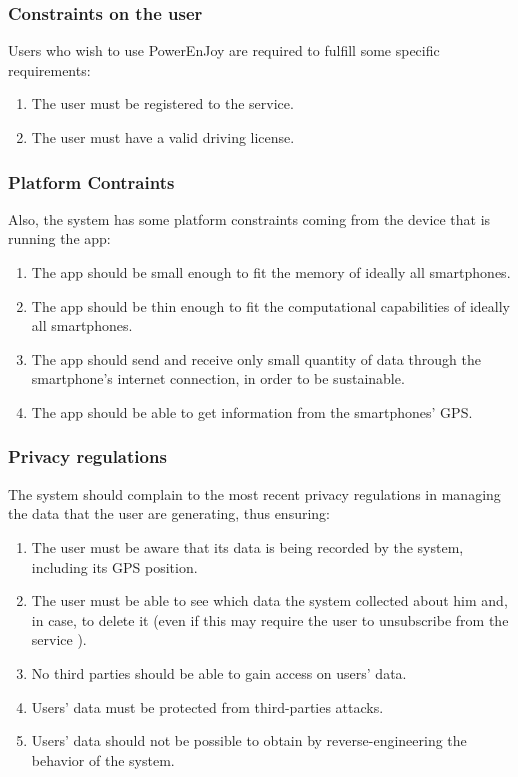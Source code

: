 \documentclass[11pt]{article} %
\newcommand{\pe}{PowerEnJoy }
\begin{document}
	\subsubsection{Constraints on the user}
Users who wish to use \pe are required to fulfill some specific requirements:
\begin{enumerate}
	\item The user must be registered to the service.
	\item The user must have a valid driving license.
\end{enumerate}

	\subsubsection{Platform Contraints}
Also, the system has some platform constraints coming from the device that is running the app:
\begin{enumerate}
	\item The app should be small enough to fit the memory of ideally all smartphones.
	\item The app should be thin enough to fit the computational capabilities of ideally all smartphones.
	\item The app should send and receive only small quantity of data through the smartphone's internet connection, in order to be sustainable.
	\item The app should be able to get information from the smartphones' GPS.
  \end{enumerate}

	\subsubsection{Privacy regulations}
The system should complain to the most recent privacy regulations in managing the data that the user are generating, thus ensuring:
\begin{enumerate}
	\item The user must be aware that its data is being recorded by the system, including its GPS position.
	\item The user must be able to see which data the system collected about him and, in case, to delete it (even if this may require the user to unsubscribe from the service
).
	\item No third parties should be able to gain access on users' data.
	\item Users' data must be protected from third-parties attacks.
	\item Users' data should not be possible to obtain by reverse-engineering the behavior of the system.
\end{enumerate}
\end{document}
